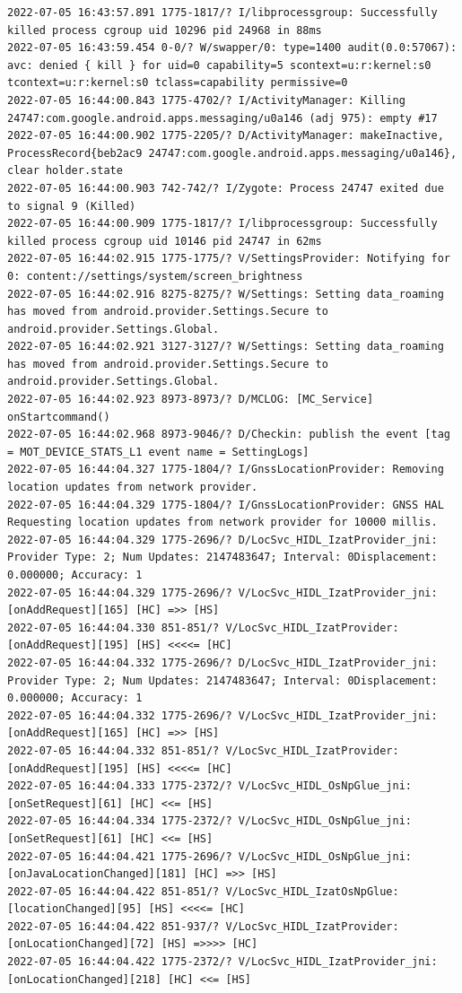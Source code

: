 \documentclass[a4paper,12pt]{book}
\begin{document}
\begin{lstlisting}
2022-07-05 16:43:57.891 1775-1817/? I/libprocessgroup: Successfully killed process cgroup uid 10296 pid 24968 in 88ms
2022-07-05 16:43:59.454 0-0/? W/swapper/0: type=1400 audit(0.0:57067): avc: denied { kill } for uid=0 capability=5 scontext=u:r:kernel:s0 tcontext=u:r:kernel:s0 tclass=capability permissive=0
2022-07-05 16:44:00.843 1775-4702/? I/ActivityManager: Killing 24747:com.google.android.apps.messaging/u0a146 (adj 975): empty #17
2022-07-05 16:44:00.902 1775-2205/? D/ActivityManager: makeInactive, ProcessRecord{beb2ac9 24747:com.google.android.apps.messaging/u0a146}, clear holder.state
2022-07-05 16:44:00.903 742-742/? I/Zygote: Process 24747 exited due to signal 9 (Killed)
2022-07-05 16:44:00.909 1775-1817/? I/libprocessgroup: Successfully killed process cgroup uid 10146 pid 24747 in 62ms
2022-07-05 16:44:02.915 1775-1775/? V/SettingsProvider: Notifying for 0: content://settings/system/screen_brightness
2022-07-05 16:44:02.916 8275-8275/? W/Settings: Setting data_roaming has moved from android.provider.Settings.Secure to android.provider.Settings.Global.
2022-07-05 16:44:02.921 3127-3127/? W/Settings: Setting data_roaming has moved from android.provider.Settings.Secure to android.provider.Settings.Global.
2022-07-05 16:44:02.923 8973-8973/? D/MCLOG: [MC_Service] onStartcommand()
2022-07-05 16:44:02.968 8973-9046/? D/Checkin: publish the event [tag = MOT_DEVICE_STATS_L1 event name = SettingLogs]
2022-07-05 16:44:04.327 1775-1804/? I/GnssLocationProvider: Removing location updates from network provider.
2022-07-05 16:44:04.329 1775-1804/? I/GnssLocationProvider: GNSS HAL Requesting location updates from network provider for 10000 millis.
2022-07-05 16:44:04.329 1775-2696/? D/LocSvc_HIDL_IzatProvider_jni: Provider Type: 2; Num Updates: 2147483647; Interval: 0Displacement: 0.000000; Accuracy: 1
2022-07-05 16:44:04.329 1775-2696/? V/LocSvc_HIDL_IzatProvider_jni: [onAddRequest][165] [HC] =>> [HS]
2022-07-05 16:44:04.330 851-851/? V/LocSvc_HIDL_IzatProvider: [onAddRequest][195] [HS] <<<<= [HC]
2022-07-05 16:44:04.332 1775-2696/? D/LocSvc_HIDL_IzatProvider_jni: Provider Type: 2; Num Updates: 2147483647; Interval: 0Displacement: 0.000000; Accuracy: 1
2022-07-05 16:44:04.332 1775-2696/? V/LocSvc_HIDL_IzatProvider_jni: [onAddRequest][165] [HC] =>> [HS]
2022-07-05 16:44:04.332 851-851/? V/LocSvc_HIDL_IzatProvider: [onAddRequest][195] [HS] <<<<= [HC]
2022-07-05 16:44:04.333 1775-2372/? V/LocSvc_HIDL_OsNpGlue_jni: [onSetRequest][61] [HC] <<= [HS]
2022-07-05 16:44:04.334 1775-2372/? V/LocSvc_HIDL_OsNpGlue_jni: [onSetRequest][61] [HC] <<= [HS]
2022-07-05 16:44:04.421 1775-2696/? V/LocSvc_HIDL_OsNpGlue_jni: [onJavaLocationChanged][181] [HC] =>> [HS]
2022-07-05 16:44:04.422 851-851/? V/LocSvc_HIDL_IzatOsNpGlue: [locationChanged][95] [HS] <<<<= [HC]
2022-07-05 16:44:04.422 851-937/? V/LocSvc_HIDL_IzatProvider: [onLocationChanged][72] [HS] =>>>> [HC]
2022-07-05 16:44:04.422 1775-2372/? V/LocSvc_HIDL_IzatProvider_jni: [onLocationChanged][218] [HC] <<= [HS]
\end{lstlisting}
\end{document}
